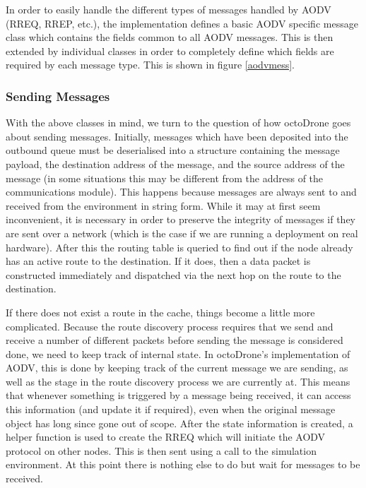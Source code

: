 In order to easily handle the different types of messages handled by AODV (RREQ, RREP, etc.), the implementation defines a basic AODV specific message class which contains the fields common to all AODV messages. This is then extended by individual classes in order to completely define which fields are required by each message type. This is shown in figure \ref{aodvmess}.

\subsubsection{Sending Messages}
With the above classes in mind, we turn to the question of how octoDrone goes about sending messages. Initially, messages which have been deposited into the outbound queue must be deserialised into a structure containing the message payload, the destination address of the message, and the source address of the message (in some situations this may be different from the address of the communications module). This happens because messages are always sent to and received from the environment in string form. While it may at first seem inconvenient, it is necessary in order to preserve the integrity of messages if they are sent over a network (which is the case if we are running a deployment on real hardware). After this the routing table is queried to find out if the node already has an active route to the destination. If it does, then a data packet is constructed immediately and dispatched via the next hop on the route to the destination.

If there does not exist a route in the cache, things become a little more complicated. Because the route discovery process requires that we send and receive a number of different packets before sending the message is considered done, we need to keep track of internal state. In octoDrone's implementation of AODV, this is done by keeping track of the current message we are sending, as well as the stage in the route discovery process we are currently at. This means that whenever something is triggered by a message being received, it can access this information (and update it if required), even when the original message object has long since gone out of scope. After the state information is created, a helper function is used to create the RREQ which will initiate the AODV protocol on other nodes. This is then sent using a call to the simulation environment. At this point there is nothing else to do but wait for messages to be received.

